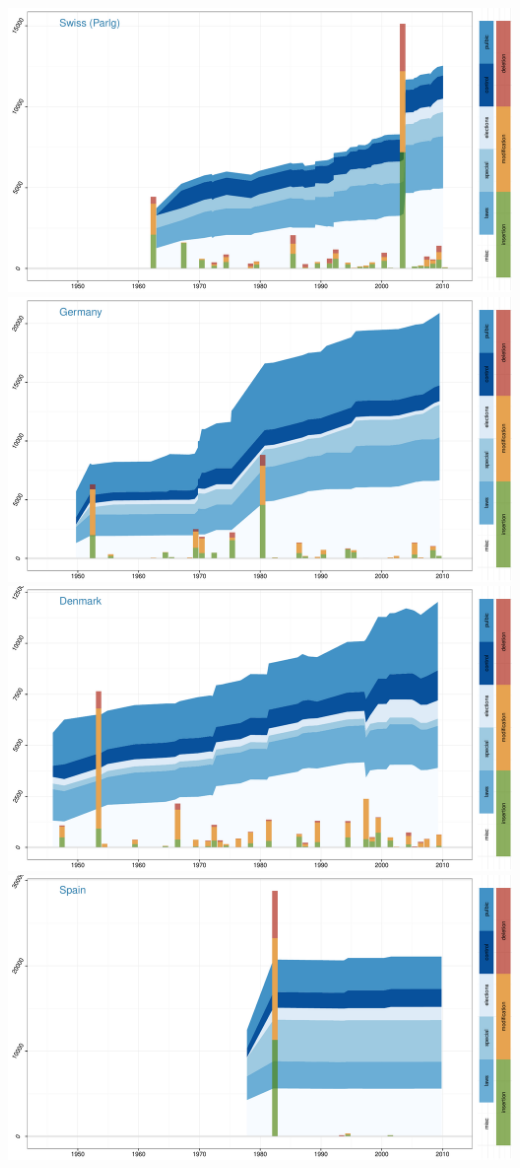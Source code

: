 \documentclass[a4paper, landscape]{article}
\begin{document}
\includegraphics{country_graphs_files/figure-latex/unnamed-chunk-3-4.pdf}
\includegraphics{country_graphs_files/figure-latex/unnamed-chunk-3-5.pdf}
\includegraphics{country_graphs_files/figure-latex/unnamed-chunk-3-6.pdf}
\includegraphics{country_graphs_files/figure-latex/unnamed-chunk-3-7.pdf}
\end{document}
